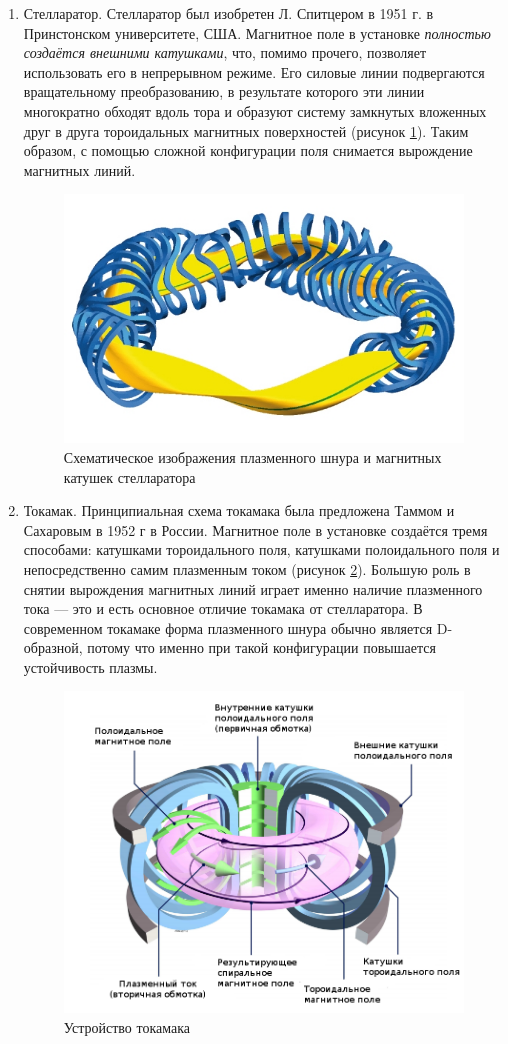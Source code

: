 \begin{enumerate}
\item Стелларатор. Стелларатор был изобретен Л. Спитцером в 1951 г. в Принстонском университете, США. Магнитное поле в установке \textit{полностью создаётся внешними катушками}, что, помимо прочего, позволяет использовать его в непрерывном режиме. Его силовые линии подвергаются вращательному преобразованию, в результате которого эти линии многократно обходят вдоль тора и образуют систему замкнутых вложенных друг в друга тороидальных магнитных поверхностей (рисунок \ref{fig:W7X-Spulen_Plasma_blau_gelb}). Таким образом, с помощью сложной конфигурации поля снимается вырождение магнитных линий.

\begin{figure}[h!]
\centering
\includegraphics[width=0.5\linewidth]{./fig/ch1/W7X-Spulen_Plasma_blau_gelb}
\caption{Схематическое изображения плазменного шнура и магнитных катушек стелларатора}
\label{fig:W7X-Spulen_Plasma_blau_gelb}
\end{figure}


\item Токамак. Принципиальная схема токамака была предложена Таммом и Сахаровым в 1952 г в России. Магнитное поле в установке создаётся тремя способами: катушками тороидального поля, катушками полоидального поля и непосредственно самим плазменным током (рисунок \ref{fig:tokamak}). Большую роль в снятии вырождения магнитных линий играет именно наличие плазменного тока --- это и есть основное отличие токамака от стелларатора. 
В современном токамаке форма плазменного шнура обычно является D-образной, потому что именно при такой конфигурации повышается устойчивость плазмы.

\begin{figure}[h!]
\centering
\includegraphics[width=0.75\linewidth]{./fig/ch1/tokamak}
\caption{Устройство токамака}
\label{fig:tokamak}
\end{figure}

\end{enumerate}



